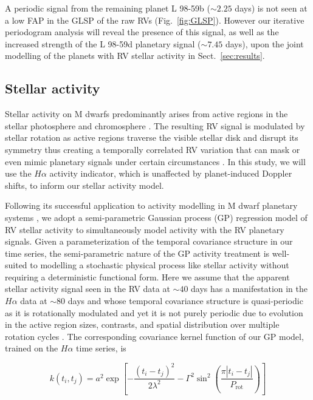 \documentclass[longauth]{aa}
\begin{document}
A periodic signal from the remaining planet L 98-59b ($\sim 2.25$ days) is not seen at a low FAP in the GLSP of the raw RVs (Fig.~\ref{fig:GLSP}). However our iterative periodogram analysis will reveal the presence of this signal, as well as the increased strength of the L 98-59d planetary signal ($\sim 7.45$ days), upon the joint modelling of the planets with RV stellar activity in Sect.~\ref{sec:results}.

\subsection{Stellar activity}
\label{subsec:act}
Stellar activity on M dwarfs predominantly arises from active regions in the stellar photosphere and chromosphere \citep{lindegren03}. The resulting RV signal is modulated by stellar rotation as active regions traverse the visible stellar disk and disrupt its symmetry thus creating a temporally correlated RV variation that can mask or even  mimic planetary signals under certain circumstances \citep{vanderburg16}. In this study, we will use the $H\alpha$ activity indicator, which is unaffected by planet-induced Doppler shifts, to inform our stellar activity model. 

Following its successful application to activity modelling in M dwarf planetary systems \citep[e.g.][]{astudillodefru17c,cloutier17b,bonfils18,cloutier19,ment19}, we adopt a semi-parametric Gaussian process (GP) regression model of RV stellar activity to simultaneously model activity with the RV planetary signals. Given a parameterization of the temporal covariance structure in our time series, the semi-parametric nature of the GP activity treatment is well-suited to modelling a stochastic physical process like stellar activity without requiring a deterministic functional form. Here we assume that the apparent stellar activity signal seen in the RV data at $\sim 40$ days has a manifestation in the $H\alpha$ data at $\sim 80$ days and whose temporal covariance structure is quasi-periodic as it is rotationally modulated and yet it is not purely periodic due to evolution in the active region sizes, contrasts, and spatial distribution over multiple rotation cycles \citep{giles17}. The corresponding covariance kernel function of our GP model, trained on the $H\alpha$ time series, is 

\begin{equation}
    k(t_i,t_j) = a^2 \exp{\left[ -\frac{(t_i-t_j)^2}{2\lambda^2} -\Gamma^2 \sin^2{\left( \frac{\pi |t_i-t_j|}{P_{\text{rot}}} \right)} \right]}
    \label{eq:kernel}
\end{equation}
\end{document}
